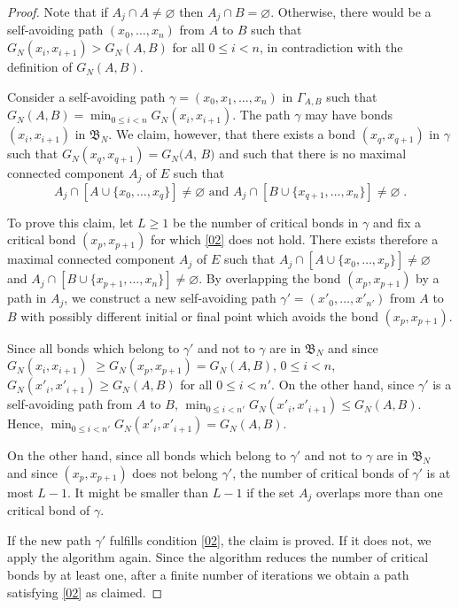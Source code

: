 \documentclass[reqno]{amsart}
\begin{document}
\begin{proof}
Note that if $A_j\cap A\not = \varnothing$ then $A_j\cap B =
\varnothing$. Otherwise, there would be a self-avoiding path $(x_0,
\dots, x_n)$ from $A$ to $B$ such that $G_N(x_i,x_{i+1})>G_N(A,B)$ for
all $0\le i<n$, in contradiction with the definition of $G_N(A,B)$.

Consider a self-avoiding path $\gamma = (x_0, x_1, \dots, x_n)$ in
$\Gamma_{A,B}$ such that $G_N(A,B) = \min_{0\le i <n}
G_N(x_i,x_{i+1})$. The path $\gamma$ may have bonds $(x_i,x_{i+1})$ in
${{\mathfrak B}}_N$. We claim, however, that there exists a bond $(x_q,x_{q+1})$
in $\gamma$ such that $G_N(x_q,x_{q+1}) = G_N(A$, $B)$ and such that
there is no maximal connected component $A_j$ of $E$ such that
\begin{equation}
\label{02}
A_j \cap [A\cup \{x_0, \dots, x_q\}] \not = \varnothing
\text{ and } A_j \cap [B\cup \{x_{q+1}, \dots, x_n\}] \not = \varnothing \;.
\end{equation}

To prove this claim, let $L\ge 1$ be the number of critical bonds in
$\gamma$ and fix a critical bond $(x_p,x_{p+1})$ for which \eqref{02}
does not hold. There exists therefore a maximal connected component
$A_j$ of $E$ such that $A_j \cap [A\cup \{x_0, \dots, x_p\}] \not =
\varnothing$ and $A_j \cap [B\cup \{x_{p+1}, \dots, x_n\} ] \not =
\varnothing$. By overlapping the bond $(x_p,x_{p+1})$ by a path in
$A_j$, we construct a new self-avoiding path $\gamma' = (x'_0, \dots,
x'_{n'})$ from $A$ to $B$ with possibly different initial or final
point which avoids the bond $(x_p,x_{p+1})$.

Since all bonds which belong to $\gamma'$ and not to $\gamma$ are in
${{\mathfrak B}}_N$ and since $G_N(x_i, x_{i+1})$ $\ge G_N(x_p, x_{p+1}) =
G_N(A,B)$, $0\le i<n$, $G_N(x'_i, x'_{i+1}) \ge G_N(A,B)$ for all
$0\le i<n'$. On the other hand, since $\gamma'$ is a self-avoiding path
from $A$ to $B$, $\min_{0\le i<n'} G_N(x'_i, x'_{i+1}) \le
G_N(A,B)$. Hence, $\min_{0\le i<n'} G_N(x'_i, x'_{i+1}) = G_N(A,B)$.

On the other hand, since all bonds which belong to $\gamma'$ and not
to $\gamma$ are in ${{\mathfrak B}}_N$ and since $(x_p, x_{p+1})$ does not
belong $\gamma'$, the number of critical bonds of $\gamma'$ is at most
$L-1$. It might be smaller than $L-1$ if the set $A_j$ overlaps more
than one critical bond of $\gamma$.

If the new path $\gamma'$ fulfills condition \eqref{02}, the claim is
proved. If it does not, we apply the algorithm again. Since the
algorithm reduces the number of critical bonds by at least one, after
a finite number of iterations we obtain a path satisfying \eqref{02}
as claimed.


\end{proof}
\end{document}
